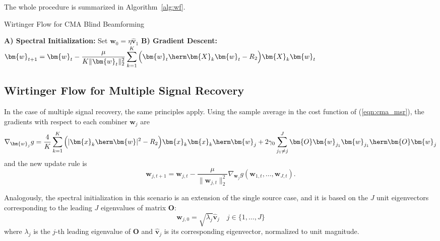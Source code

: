 The whole procedure is summarized in Algorithm~\ref{alg:wf}.
\begin{algorithm}[H]
	\caption{Wirtinger Flow for CMA Blind Beamforming}
	\label{alg:wf}
	\begin{algorithmic}[1]
		\Statex \textbf{A) Spectral Initialization:}
		\State Set $\bm{w}_0=\eta\hat{\bm{v}}_1$ 
		\Statex \textbf{B) Gradient Descent:}
		\State $\displaystyle \bm{w}_{t+1}=\bm{w}_t-\frac{\mu}{K\|\bm{w}_t\|_2^2}\sum_{k=1}^K\Big(\bm{w}_t\herm\bm{X}_k\bm{w}_t-R_2\Big)\bm{X}_k\bm{w}_t$
		\EndFor
	\end{algorithmic}
\end{algorithm}

\subsection{Wirtinger Flow for Multiple Signal Recovery}
In the case of multiple signal recovery, the same principles apply. Using the sample average in the cost function of (\ref{eqn:cma_msr}), the gradients with respect to each combiner $\bm{w}_j$ are
\begin{equation}
\nabla_{\bm{w}_j}g=\frac{4}{K}\sum_{k=1}^K\Big(|\bm{x}_k\herm\bm{w}|^2-R_2\Big)\bm{x}_k\bm{x}_k\herm\bm{w}_j+2\gamma_0\sum_{j_1\neq j}^J\bm{O}\bm{w}_{j_1}\bm{w}_{j_1}\herm\bm{O}\bm{w}_j \label{eqn:wfgradient_msr}
\end{equation}
and the new update rule is  
\begin{equation}
\bm{w}_{j,t+1}=\bm{w}_{j,t}-\frac{\mu}{\|\bm{w}_{j,t}\|_2^2}\nabla_{\bm{w}_j}g(\bm{w}_{1,t},\ldots,\bm{w}_{J,t}). \label{eqn:wfupdaterule_msr}
\end{equation}

Analogously, the spectral initialization in this scenario is an extension of the single source case, and it is based on the $J$ unit eigenvectors corresponding to the leading $J$ eigenvalues of matrix $\bm{O}$:  
\begin{equation}
\bm{w}_{j,0} = \sqrt{\lambda_j}\hat{\bm{v}}_j\quad j\in\{1,\ldots,J\}
\end{equation}
where $\lambda_j$ is the $j$-th leading eigenvalue of $\bm{O}$ and $\hat{\bm{v}}_j$ is its corresponding eigenvector, normalized to unit magnitude. 

